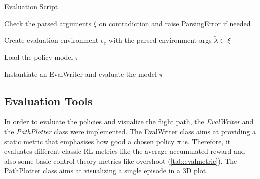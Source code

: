 \begin{algorithm}
	\caption{Evaluation Script}
	\label{alg:eval}
	Check the parsed arguments $\xi$ on contradiction and raise ParsingError if needed
	
	Create evaluation environment $\epsilon_e$ with the parsed environment args $\tilde{\lambda} \subset \xi$
	
	Load the policy model $\pi$
	
	Instantiate an EvalWriter and evaluate the model $\pi$
	


\end{algorithm}

\newpage

\newpage

\subsection{Evaluation Tools} \label{sec:tools}
In order to evaluate the policies and visualize the flight path, the \emph{EvalWriter} and the \emph{PathPlotter} class were implemented.
The EvalWriter class aims at providing a static metric that emphasises how good a chosen policy $\pi$ is. Therefore, it evaluates different classic RL metrics like the average accumulated reward and also some basic control theory metrics like overshoot (\cref{tab:evalmetric}).
The PathPlotter class aims at visualizing a single episode in a 3D plot.

